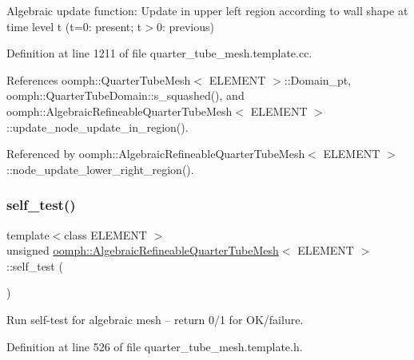 Algebraic update function\+: Update in upper left region according to wall shape at time level t (t=0\+: present; t$>$0\+: previous) 

Definition at line 1211 of file quarter\+\_\+tube\+\_\+mesh.\+template.\+cc.



References oomph\+::\+Quarter\+Tube\+Mesh$<$ E\+L\+E\+M\+E\+N\+T $>$\+::\+Domain\+\_\+pt, oomph\+::\+Quarter\+Tube\+Domain\+::s\+\_\+squashed(), and oomph\+::\+Algebraic\+Refineable\+Quarter\+Tube\+Mesh$<$ E\+L\+E\+M\+E\+N\+T $>$\+::update\+\_\+node\+\_\+update\+\_\+in\+\_\+region().



Referenced by oomph\+::\+Algebraic\+Refineable\+Quarter\+Tube\+Mesh$<$ E\+L\+E\+M\+E\+N\+T $>$\+::node\+\_\+update\+\_\+lower\+\_\+right\+\_\+region().

\mbox{\label{classoomph_1_1AlgebraicRefineableQuarterTubeMesh_a1ad71be8274f4073b7e18cb53d574f10}} 
\subsubsection{\texorpdfstring{self\+\_\+test()}{self\_test()}}
{\footnotesize\ttfamily template$<$class E\+L\+E\+M\+E\+NT $>$ \\
unsigned \hyperlink{classoomph_1_1AlgebraicRefineableQuarterTubeMesh}{oomph\+::\+Algebraic\+Refineable\+Quarter\+Tube\+Mesh}$<$ E\+L\+E\+M\+E\+NT $>$\+::self\+\_\+test (\begin{DoxyParamCaption}{ }\end{DoxyParamCaption})\hspace{0.3cm}{\ttfamily [inline]}}



Run self-\/test for algebraic mesh -- return 0/1 for O\+K/failure. 



Definition at line 526 of file quarter\+\_\+tube\+\_\+mesh.\+template.\+h.

\mbox{\label{classoomph_1_1AlgebraicRefineableQuarterTubeMesh_a2d0312615834a2aec8d0d6d4e2c846ef}} 
